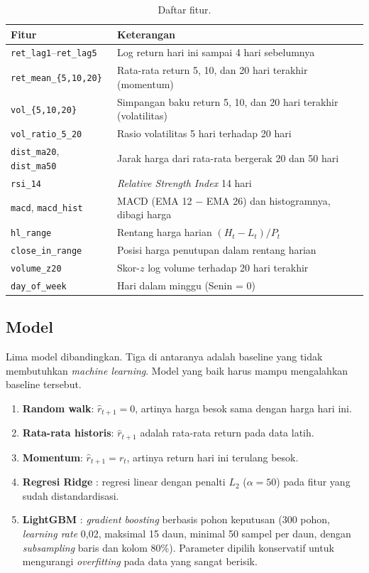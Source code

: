 \documentclass[11pt,a4paper]{article}
\begin{document}
\begin{table}[H]
  \centering
  \caption{Daftar fitur.}
  \label{tab:fitur}
  \small
  \begin{tabularx}{\linewidth}{lX}
    \toprule
    Fitur & Keterangan \\
    \midrule
    \texttt{ret\_lag1}--\texttt{ret\_lag5} & Log return hari ini sampai 4 hari sebelumnya \\
    \texttt{ret\_mean\_\{5,10,20\}} & Rata-rata return 5, 10, dan 20 hari terakhir (momentum) \\
    \texttt{vol\_\{5,10,20\}} & Simpangan baku return 5, 10, dan 20 hari terakhir (volatilitas) \\
    \texttt{vol\_ratio\_5\_20} & Rasio volatilitas 5 hari terhadap 20 hari \\
    \texttt{dist\_ma20}, \texttt{dist\_ma50} & Jarak harga dari rata-rata bergerak 20 dan 50 hari \\
    \texttt{rsi\_14} & \emph{Relative Strength Index} 14 hari \citep{wilder1978} \\
    \texttt{macd}, \texttt{macd\_hist} & MACD (EMA 12 $-$ EMA 26) dan histogramnya, dibagi harga \\
    \texttt{hl\_range} & Rentang harga harian $(H_t - L_t)/P_t$ \\
    \texttt{close\_in\_range} & Posisi harga penutupan dalam rentang harian \\
    \texttt{volume\_z20} & Skor-$z$ log volume terhadap 20 hari terakhir \\
    \texttt{day\_of\_week} & Hari dalam minggu (Senin = 0) \\
    \bottomrule
  \end{tabularx}
\end{table}

\subsection{Model}
Lima model dibandingkan. Tiga di antaranya adalah baseline yang tidak membutuhkan
\emph{machine learning}. Model yang baik harus mampu mengalahkan baseline tersebut.
\begin{enumerate}
  \item \textbf{Random walk}: $\hat r_{t+1} = 0$, artinya harga besok sama dengan harga hari ini.
  \item \textbf{Rata-rata historis}: $\hat r_{t+1}$ adalah rata-rata return pada data latih.
  \item \textbf{Momentum}: $\hat r_{t+1} = r_t$, artinya return hari ini terulang besok.
  \item \textbf{Regresi Ridge} \citep{hoerl1970}: regresi linear dengan penalti $L_2$
        ($\alpha = 50$) pada fitur yang sudah distandardisasi.
  \item \textbf{LightGBM} \citep{ke2017}: \emph{gradient boosting} berbasis pohon keputusan
        (300 pohon, \emph{learning rate} 0{,}02, maksimal 15 daun, minimal 50 sampel per daun,
        dengan \emph{subsampling} baris dan kolom 80\%). Parameter dipilih konservatif untuk
        mengurangi \emph{overfitting} pada data yang sangat berisik.
\end{enumerate}
\end{document}
